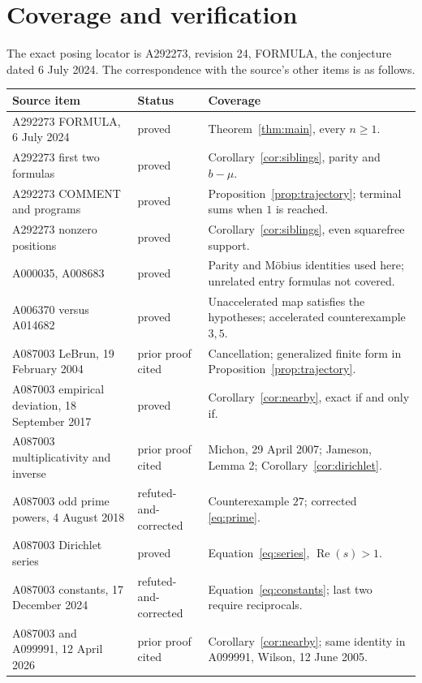 \documentclass[11pt]{article}
\newcommand{\Rea}{\operatorname{Re}}
\begin{document}
\section{Coverage and verification}
The exact posing locator is A292273, revision 24, FORMULA, the
conjecture dated 6 July 2024. The correspondence with the source's other
items is as follows.
\begingroup\footnotesize
\setlength{\tabcolsep}{3pt}
\begin{longtable}{@{}>{\raggedright\arraybackslash}p{.31\linewidth}>{\raggedright\arraybackslash}p{.20\linewidth}>{\raggedright\arraybackslash}p{.44\linewidth}@{}}
\toprule Source item&Status&Coverage\\\midrule\endhead
A292273 FORMULA, 6 July 2024&proved&Theorem~\ref{thm:main}, every $n\geq1$.\\
A292273 first two formulas&proved&Corollary~\ref{cor:siblings}, parity and $b-\mu$.\\
A292273 COMMENT and programs&proved&Proposition~\ref{prop:trajectory}; terminal sums when $1$ is reached.\\
A292273 nonzero positions&proved&Corollary~\ref{cor:siblings}, even squarefree support.\\
A000035, A008683&proved&Parity and M\"obius identities used here; unrelated entry formulas not covered.\\
A006370 versus A014682&proved&Unaccelerated map satisfies the hypotheses; accelerated counterexample $3,5$.\\
A087003 LeBrun, 19 February 2004&prior proof cited&Cancellation; generalized finite form in Proposition~\ref{prop:trajectory}.\\
A087003 empirical deviation, 18 September 2017&proved&Corollary~\ref{cor:nearby}, exact if and only if.\\
A087003 multiplicativity and inverse&prior proof cited&Michon, 29 April 2007; Jameson, Lemma 2; Corollary~\ref{cor:dirichlet}.\\
A087003 odd prime powers, 4 August 2018&refuted-and-corrected&Counterexample $27$; corrected \eqref{eq:prime}.\\
A087003 Dirichlet series&proved&Equation~\eqref{eq:series}, $\Rea(s)>1$.\\
A087003 constants, 17 December 2024&refuted-and-corrected&Equation~\eqref{eq:constants}; last two require reciprocals.\\
A087003 and A099991, 12 April 2026&prior proof cited&Corollary~\ref{cor:nearby}; same identity in A099991, Wilson, 12 June 2005.\\

\end{longtable}
\end{document}
